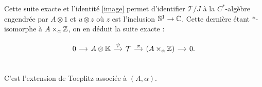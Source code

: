 Cette suite exacte et l'identité \ref{image} permet d'identifier $\mathcal T / J$ à la $C^*$-algèbre engendrée par $A\otimes 1$ et $u\otimes z$ où $z$ est l'inclusion $\mathbb S^1 \rightarrow \mathbb C$. Cette dernière étant $*$-isomorphe à $A\times_\alpha \mathbb Z$, on en déduit la suite exacte :

\[\begin{tikzcd}[column sep=small]
0 \arrow{r} &  A\otimes \K \arrow{r}{\psi} &  \mathcal T \arrow{r}{\pi}  &  (A\times _\alpha \Z) \arrow{r} & 0. \\ 
\end{tikzcd}\] 
C'est l'extension de Toeplitz associée à $(A,\alpha)$.
